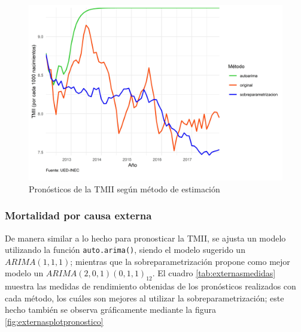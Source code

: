 \documentclass[
]{article}
\begin{document}
\begin{table}[!h]

\caption{\label{tab:unnamed-chunk-19}\label{tab:tmiimedidas}Medidas de rendimiento según método de estimación para la TMII}
\centering
{}
\end{table}

\begin{figure}[!h]
\includegraphics[width=1\linewidth,height=1\textheight]{Tesis_files/figure-latex/tmiiplotpronostico-1} \caption{Pronósticos de la TMII según método de estimación}\label{fig:tmiiplotpronostico}
\end{figure}

\subsubsection{Mortalidad por causa externa}

De manera similar a lo hecho para pronosticar la TMII, se ajusta un
modelo utilizando la función \texttt{auto.arima()}, siendo el modelo
sugerido un \(ARIMA(1,1,1)\); mientras que la sobreparametrización
propone como mejor modelo un \(ARIMA(2,0,1)(0,1,1)_{12}\). El cuadro
\ref{tab:externasmedidas} muestra las medidas de rendimiento obtenidas
de los pronósticos realizados con cada método, los cuáles son mejores al
utilizar la sobreparametrización; este hecho también se observa
gráficamente mediante la figura \ref{fig:externasplotpronostico}
\end{document}
